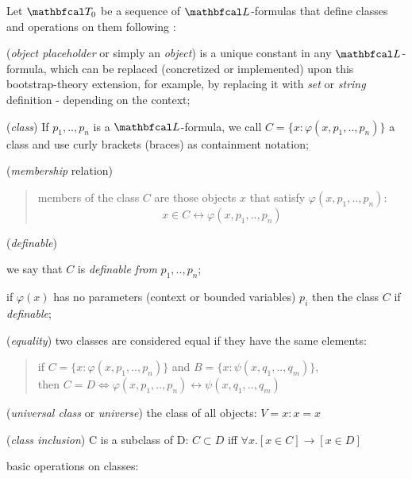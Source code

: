 \begin{definition}\label{def_bt_co}
  Let $\LsT_0$ be a sequence of $\lsign$-formulas that define classes and operations on them following \cite{jech2003set}:

  \begin{legal}
    \item (\textit{object placeholder} or simply an \textit{object}) is a unique constant in any  $\lsign$-formula, which can be replaced (concretized or implemented) upon this bootstrap-theory extension, for example, by replacing it with \textit{set} or \textit{string} definition - depending on the context;
    \item (\textit{class}) If $p_1, .., p_n$ is a $\lsign$-formula, we call $C = \{x : \varphi(x, p_1, .., p_n)\}$ a class and use curly brackets (braces) as containment notation;
    \item (\textit{membership} relation)
    \begin{quote}    
      members of the class $C$ are those objects $x$ that satisfy $\varphi(x, p_1, .., p_n)$: 
      \[ x \in C \leftrightarrow \varphi(x, p_1, .., p_n) \]
    \end{quote}
    \item (\textit{definable})
    \begin{legal}
      \item we say that $C$ is \textit{definable from} $p_1, .., p_n$; 
      \item if $\varphi(x)$ has no parameters (context or bounded variables) $p_i$ then the class $C$ if \textit{definable};
    \end{legal}
    \item (\textit{equality}) two classes are considered equal if they have the same elements:
      \begin{quote}    
        if $C = \{x : \varphi(x, p_1, .., p_n)\}$ 
        and $B = \{x : \psi(x, q_1, .., q_m)\}$, \\
        then $C = D \Leftrightarrow \varphi(x, p_1, .., p_n) \leftrightarrow \psi(x, q_1, .., q_m)$ 
      \end{quote}
    \item (\textit{universal class} or \textit{universe}) the class of all objects: $V = { x : x = x }$
    \item (\textit{class inclusion}) C is a subclass of D: $ C \subset D $ iff $\forall x. [x \in C] \rightarrow [x \in D]$
    \item basic operations on classes:

\end{legal}
\end{definition}
